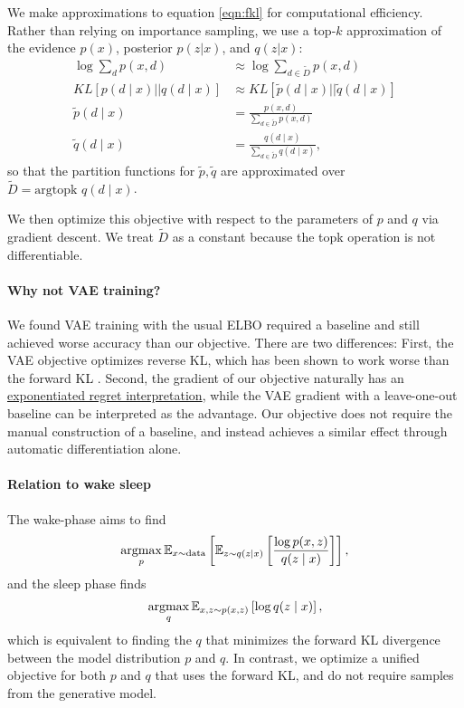 \documentclass[11pt]{article}
\begin{document}
We make approximations to equation \ref{eqn:fkl} for computational efficiency.
Rather than relying on importance sampling, we use a top-$k$ approximation
of the evidence $p(x)$, posterior $p(z|x)$, and $q(z|x)$:
\begin{align*}
\log\sum_d p(x,d) &\approx \log\sum_{d\in \tilde{D}} p(x,d)\\
KL[p(d\mid x) || q(d \mid x)] &\approx KL[\tilde{p}(d\mid x) || \tilde{q}(d \mid x)]\\
\tilde{p}(d\mid x) &= \frac{p(x,d)}{\sum_{d \in \tilde{D}} p(x,d)}\\
\tilde{q}(d\mid x) &= \frac{q(d\mid x)}{\sum_{d \in \tilde{D}} q(d\mid x)},
\end{align*}
so that the partition functions for $\tilde{p},\tilde{q}$ are approximated over
$\tilde{D} = \text{argtopk } q(d\mid x)$.

We then optimize this objective with respect to the parameters of $p$ and $q$ 
via gradient descent. We treat $\tilde{D}$ as a constant because the topk operation
is not differentiable.

\paragraph{Why not VAE training?} We found VAE training with the usual ELBO
required a baseline and still achieved worse accuracy than our objective.
There are two differences:
First, the VAE objective optimizes reverse KL, which has
been shown to work worse than the forward KL \cite{fkl}.
Second, the gradient of our objective naturally has an
\href{https://github.com/justinchiu/elbos-baselines}{exponentiated regret interpretation},
while the VAE gradient with a leave-one-out baseline can be interpreted as the advantage.
Our objective does not require the manual construction of a baseline,
and instead achieves a similar effect through automatic differentiation alone.

\paragraph{Relation to wake sleep} The wake-phase aims to find
\begin{equation}
\operatorname*{argmax}_p \mathbb{E}_{x\sim \text{data}}\left[\mathbb{E}_{z\sim q(z\mid x)}\left[\frac{\log p(x,z)}{q(z\mid x)}\right]\right],
\end{equation}
and the sleep phase finds
\begin{equation}
\operatorname*{argmax}_q \mathbb{E}_{x,z\sim p(x,z)}\left[\log q(z\mid x)\right],
\end{equation}
which is equivalent to finding the $q$ that minimizes the forward KL divergence
between the model distribution $p$ and $q$.
In contrast, we optimize a unified objective for both $p$ and $q$ that uses
the forward KL,
and do not require samples from the generative model.
\end{document}
